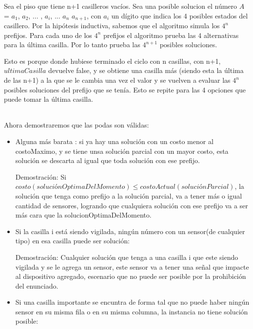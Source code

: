 {{{Sea el piso que tiene n+1 casilleros vacíos. Sea una posible solucion el número $A$ = $a_{1}$, $a_{2}$, ... , $a_i$, ... $a_n$ $a_{n+1}$, con $a_i$ un dígito que indica
los 4 posibles estados del casillero. Por la hipótesis inductiva, sabemos que el algoritmo simula los $4^n$ prefijos. Para cada uno de los $4^n$ prefijos el algoritmo 
prueba las 4 alternativas para la última casilla. Por lo tanto prueba las $4^{n+1}$ posibles soluciones.

Esto es porque donde hubiese terminado el ciclo con n casillas, con n+1, $ultimaCasilla$ devuelve false, y se obtiene una casilla más (siendo esta la última de las n+1)
a la que se le cambia una vez el valor y se vuelven a evaluar las $4^n$ posibles soluciones del prefijo que se tenía.
Esto se repite para las 4 opciones que puede tomar la última casilla. 


}

\medskip
\\Ahora demostraremos que las podas son válidas:

\begin{itemize}
\item \par{Alguna más barata : si ya hay una solución con un costo menor al costoMaximo, y se tiene unsa solución parcial con un mayor costo, esta
solución se descarta al igual que toda solución con ese prefijo. 


Demostración: Si $costo(soluciónOptimaDelMomento) \le costoActual(soluciónParcial)$, la solución que tenga como prefijo a la solución parcial, va a tener más o
igual cantidad de sensores, logrando que cualquiera solución con ese prefijo va a ser más cara que la solucionOptimaDelMomento. }

\medskip

\item \par{Si la casilla i está siendo vigilada, ningún número con un sensor(de cualquier tipo) en esa casilla puede ser solución:


Demostración: Cualquier solución que tenga a una casilla i que este siendo vigilada y se le agrega un sensor, este sensor va a tener una señal que impacte al dispositivo agregado, escenario que no puede ser posible por la prohibición del enunciado.
}
\medskip
\item \par{Si una casilla importante se encuntra de forma tal que no puede haber ningún sensor en su misma fila o en su misma
columna, la instancia no tiene solución posible:


}
\end{itemize}}}
